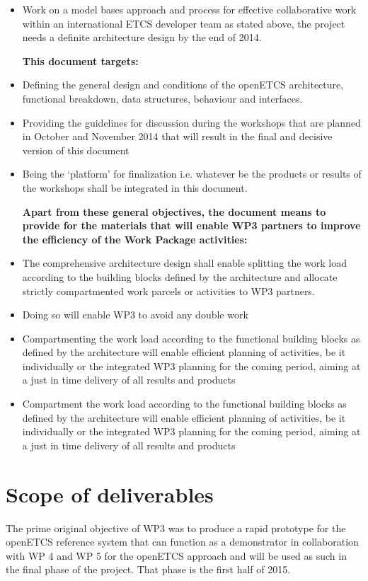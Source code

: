 \begin{itemize}
\item Work on a model bases approach and process for effective collaborative work within an international ETCS developer team as stated above, the project needs a definite architecture design by the end of 2014.

\textbf{This document targets:}
\item Defining the general design and conditions of the openETCS architecture, functional breakdown, data structures, behaviour and interfaces.
\item Providing the guidelines for discussion during the workshops that are planned in October and November 2014 that will result in the final and decisive version of this document
\item Being the ‘platform’ for finalization i.e. whatever be the products or results of the workshops shall be integrated in this document.

\textbf{Apart from these general objectives, the document means to provide for the materials that will enable WP3 partners to improve the efficiency of the Work Package activities:}
\item The comprehensive architecture design shall enable splitting the work load according to the building blocks defined by the architecture and allocate strictly compartmented work parcels or activities to WP3 partners.
\item Doing so will enable WP3 to avoid any double work
\item  Compartmenting the work load according to the functional building blocks as defined by the architecture will enable efficient planning of activities, be it individually or the integrated WP3 planning for the coming period, aiming at a just in time delivery of all results and products
\item  Compartment the work load according to the functional building blocks as defined by the architecture will enable efficient planning of activities, be it individually or the integrated WP3 planning for the coming period, aiming at a just in time delivery of all results and products
\end{itemize}



\section{Scope of deliverables}

The prime original objective of WP3 was to produce a rapid prototype for the openETCS reference system that can function as a demonstrator in collaboration with WP 4 and WP 5  for the openETCS approach and will be used as such in the final phase of the project. That phase is the first half of 2015. \\

